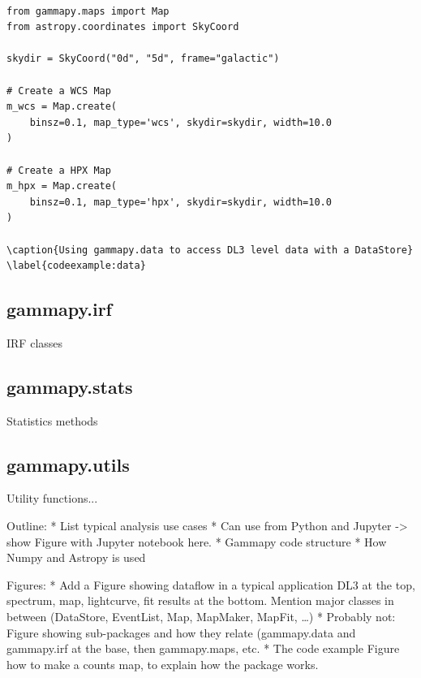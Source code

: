 \begin{lstlisting}

from gammapy.maps import Map
from astropy.coordinates import SkyCoord

skydir = SkyCoord("0d", "5d", frame="galactic")

# Create a WCS Map
m_wcs = Map.create(
	binsz=0.1, map_type='wcs', skydir=skydir, width=10.0
)

# Create a HPX Map
m_hpx = Map.create(
	binsz=0.1, map_type='hpx', skydir=skydir, width=10.0
)

\caption{Using gammapy.data to access DL3 level data with a DataStore}
\label{codeexample:data}
\end{lstlisting}


\subsection{gammapy.irf}
IRF classes

\subsection{gammapy.stats}
Statistics methods


\subsection{gammapy.utils}
Utility functions...


Outline:
* List typical analysis use cases
* Can use from Python and Jupyter -> show Figure with Jupyter notebook here.
* Gammapy code structure
* How Numpy and Astropy is used


Figures:
* Add a Figure showing dataflow in a typical application
DL3 at the top, spectrum, map, lightcurve, fit results at the bottom.
Mention major classes in between (DataStore, EventList, Map, MapMaker, MapFit, …)
* Probably not: Figure showing sub-packages and how they relate (gammapy.data and gammapy.irf at the base, then gammapy.maps, etc.
* The code example Figure how to make a counts map, to explain how the package works.
